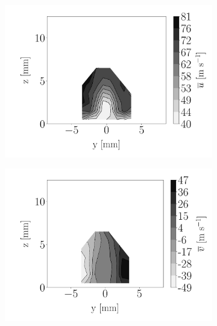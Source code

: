 \begin{figure}[h!]
\begin{subfigure}[b]{0.3\textwidth}
	\centering
   \includegraphics[scale=\scaleSLIJICF]{./part2_developments/figures_ch5_resolved_JICF/injectors_SLI/uG100_dx10_x05_ux_mean_map}
\end{subfigure}
   \hspace{0.17in}
\begin{subfigure}[b]{0.3\textwidth}
	\centering
   \includegraphics[scale=\scaleSLIJICF]{./part2_developments/figures_ch5_resolved_JICF/injectors_SLI/uG100_dx10_x05_uy_mean_map}
\end{subfigure}
   \hspace{0.17in}

\end{figure}
